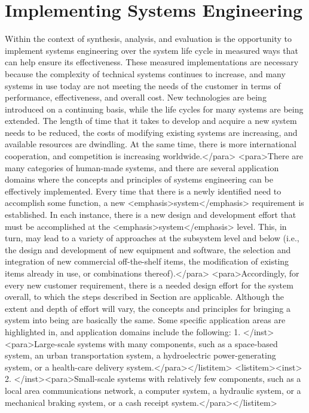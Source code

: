 \section{Implementing Systems Engineering}

Within the context of synthesis, analysis, and evaluation is the opportunity to implement systems engineering over the system life cycle in measured ways that can help ensure its effectiveness. These measured implementations are necessary because the complexity of technical systems continues to increase, and many systems in use today are not meeting the needs of the customer in terms of performance, effectiveness, and overall cost. New technologies are being introduced on a continuing basis, while the life cycles for many systems are being extended. The length of time that it takes to develop and acquire a new system needs to be reduced, the costs of modifying existing systems are increasing, and available resources are dwindling. At the same time, there is more international cooperation, and competition is increasing worldwide.</para>
	<para>There are many categories of human-made systems, and there are several application domains where the concepts and principles of systems engineering can be effectively implemented. Every time that there is a newly identified need to accomplish some function, a new <emphasis>system</emphasis> requirement is established. In each instance, there is a new design and development effort that must be accomplished at the <emphasis>system</emphasis> level. This, in turn, may lead to a variety of approaches at the subsystem level and below (i.e., the design and development of new equipment and software, the selection and integration of new commercial off-the-shelf items, the modification of existing items already in use, or combinations thereof).</para>
<para>Accordingly, for every new customer requirement, there is a needed design effort for the system overall, to which the steps described in Section are applicable. Although the extent and depth of effort will vary, the concepts and principles for bringing a system into being are basically the same. Some specific application areas are highlighted in, and application domains include the following:
1.	</inst><para>Large-scale systems with many components, such as a space-based system, an urban transportation system, a hydroelectric power-generating system, or a health-care delivery system.</para></listitem>
<listitem><inst>	2.	</inst><para>Small-scale systems with relatively few components, such as a local area communications network, a computer system, a hydraulic system, or a mechanical braking system, or a cash receipt system.</para></listitem>
